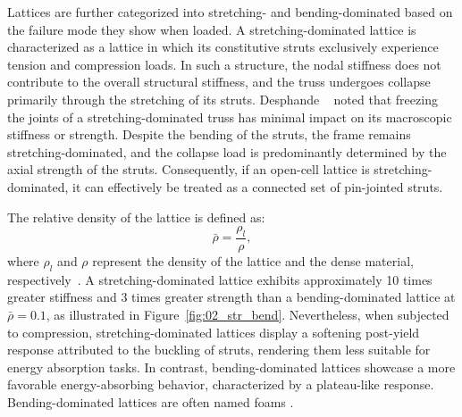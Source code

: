 Lattices are further categorized into stretching- and bending-dominated based on the failure mode they show when loaded. A stretching-dominated lattice is characterized as a lattice in which its constitutive struts exclusively experience tension and compression loads. In such a structure, the nodal stiffness does not contribute to the overall structural stiffness, and the truss undergoes collapse primarily through the stretching of its struts. Desphande \etal~\cite{deshpande_foam_2001} noted that freezing the joints of a stretching-dominated truss has minimal impact on its macroscopic stiffness or strength. Despite the bending of the struts, the frame remains stretching-dominated, and the collapse load is predominantly determined by the axial strength of the struts. Consequently, if an open-cell lattice is stretching-dominated, it can effectively be treated as a connected set of pin-jointed struts.

The relative density of the lattice is defined as:
\begin{equation}
    \bar{\rho} = \frac{\rho_l}{\rho},
\end{equation}
where $\rho_l$ and $\rho$ represent the density of the lattice and the dense material, respectively~. A stretching-dominated lattice exhibits approximately 10 times greater stiffness and 3 times greater strength than a bending-dominated lattice at $\bar{\rho} = 0.1$, as illustrated in Figure~\ref{fig:02_str_bend}. Nevertheless, when subjected to compression, stretching-dominated lattices display a softening post-yield response attributed to the buckling of struts, rendering them less suitable for energy absorption tasks. In contrast, bending-dominated lattices showcase a more favorable energy-absorbing behavior, characterized by a plateau-like response. Bending-dominated lattices are often named foams \cite{ashby_properties_2006}.


